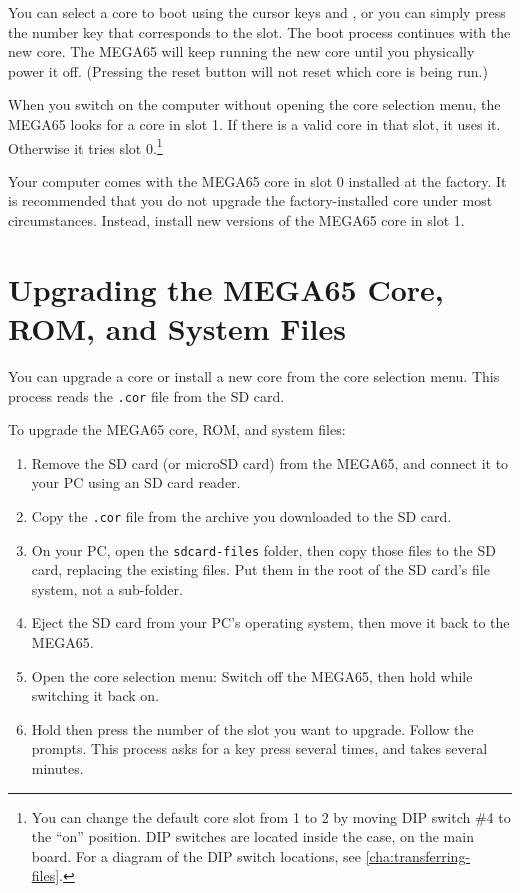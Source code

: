 You can select a core to boot using the cursor keys and , or you can simply press the number key that corresponds to the slot. The boot process continues with the new core. The MEGA65 will keep running the new core until you physically power it off. (Pressing the reset button will not reset which core is being run.)

When you switch on the computer without opening the core selection menu, the MEGA65 looks for a core in slot 1. If there is a valid core in that slot, it uses it. Otherwise it tries slot 0.\footnote{You can change the default core slot from 1 to 2 by moving DIP switch \#4 to the ``on'' position. DIP switches are located inside the case, on the main board. For a diagram of the DIP switch locations, see \vref{cha:transferring-files}.}

Your computer comes with the MEGA65 core in slot 0 installed at the factory. It is recommended that you do not upgrade the factory-installed core under most circumstances. Instead, install new versions of the MEGA65 core in slot 1.

\section{Upgrading the MEGA65 Core, ROM, and System Files}

You can upgrade a core or install a new core from the core selection menu. This process reads the {\tt .cor} file from the SD card.

To upgrade the MEGA65 core, ROM, and system files:

\begin{enumerate}
  \item Remove the SD card (or microSD card) from the MEGA65, and connect it to your PC using an SD card reader.
  \item Copy the {\tt .cor} file from the archive you downloaded to the SD card.
  \item On your PC, open the {\tt sdcard-files} folder, then copy those files to the SD card, replacing the existing files. Put them in the root of the SD card's file system, not a sub-folder.
  \item Eject the SD card from your PC's operating system, then move it back to the MEGA65.
  \item Open the core selection menu: Switch off the MEGA65, then hold  while switching it back on.
  \item Hold  then press the number of the slot you want to upgrade. Follow the prompts. This process asks for a key press several times, and takes several minutes.
\end{enumerate}

